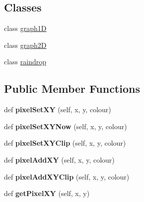 \subsection*{Classes}
\begin{DoxyCompactItemize}
\item 
class \hyperlink{classglowbit_1_1glowbitMatrix_1_1graph1D}{graph1D}
\item 
class \hyperlink{classglowbit_1_1glowbitMatrix_1_1graph2D}{graph2D}
\item 
class \hyperlink{classglowbit_1_1glowbitMatrix_1_1raindrop}{raindrop}
\end{DoxyCompactItemize}
\subsection*{Public Member Functions}
\begin{DoxyCompactItemize}
\item 
\mbox{\label{classglowbit_1_1glowbitMatrix_a5f20884e1b08bc66e54860d0bbf0d22e}} 
def {\bfseries pixel\+Set\+XY} (self, x, y, colour)
\item 
\mbox{\label{classglowbit_1_1glowbitMatrix_ab100bb891bab3d6479b066049ce9a367}} 
def {\bfseries pixel\+Set\+X\+Y\+Now} (self, x, y, colour)
\item 
\mbox{\label{classglowbit_1_1glowbitMatrix_af33f1952a94e2f0933386ae2e7c5bca4}} 
def {\bfseries pixel\+Set\+X\+Y\+Clip} (self, x, y, colour)
\item 
\mbox{\label{classglowbit_1_1glowbitMatrix_ae05d008c207c5f5219e737d29185501e}} 
def {\bfseries pixel\+Add\+XY} (self, x, y, colour)
\item 
\mbox{\label{classglowbit_1_1glowbitMatrix_a4f2deb5f58f45e285e84c9cac1644618}} 
def {\bfseries pixel\+Add\+X\+Y\+Clip} (self, x, y, colour)
\item 
\mbox{\label{classglowbit_1_1glowbitMatrix_ab67885d63f392afa061c8455de3e31ba}} 
def {\bfseries get\+Pixel\+XY} (self, x, y)
\item 
\mbox{\label{classglowbit_1_1glowbitMatrix_a373a7739051a7399a94636375ac0b4ec}} 

\end{DoxyCompactItemize}
